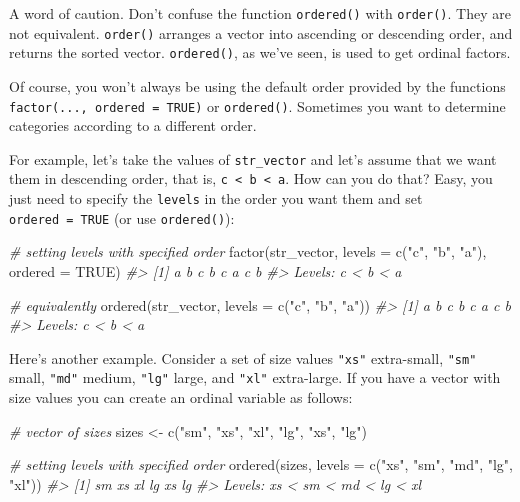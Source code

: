 \documentclass[
]{book}
\newenvironment{Shaded}{\begin{snugshade}}{\end{snugshade}}
\newcommand{\AttributeTok}[1]{\textcolor[rgb]{0.77,0.63,0.00}{#1}}
\newcommand{\CommentTok}[1]{\textcolor[rgb]{0.56,0.35,0.01}{\textit{#1}}}
\newcommand{\ConstantTok}[1]{\textcolor[rgb]{0.00,0.00,0.00}{#1}}
\newcommand{\FunctionTok}[1]{\textcolor[rgb]{0.00,0.00,0.00}{#1}}
\newcommand{\NormalTok}[1]{#1}
\newcommand{\OtherTok}[1]{\textcolor[rgb]{0.56,0.35,0.01}{#1}}
\newcommand{\StringTok}[1]{\textcolor[rgb]{0.31,0.60,0.02}{#1}}
\begin{document}
A word of caution. Don't confuse the function \texttt{ordered()} with \texttt{order()}. They
are not equivalent. \texttt{order()} arranges a vector into ascending or descending
order, and returns the sorted vector. \texttt{ordered()}, as we've seen, is used to
get ordinal factors.

Of course, you won't always be using the default order provided by the
functions \texttt{factor(...,\ ordered\ =\ TRUE)} or \texttt{ordered()}. Sometimes you want to
determine categories according to a different order.

For example, let's take the values of \texttt{str\_vector} and let's assume that we
want them in descending order, that is, \texttt{c\ \textless{}\ b\ \textless{}\ a}. How can you do that? Easy,
you just need to specify the \texttt{levels} in the order you want them and set
\texttt{ordered\ =\ TRUE} (or use \texttt{ordered()}):

\begin{Shaded}
\begin{Highlighting}[]
\CommentTok{\# setting levels with specified order}
\FunctionTok{factor}\NormalTok{(str\_vector, }\AttributeTok{levels =} \FunctionTok{c}\NormalTok{(}\StringTok{"c"}\NormalTok{, }\StringTok{"b"}\NormalTok{, }\StringTok{"a"}\NormalTok{), }\AttributeTok{ordered =} \ConstantTok{TRUE}\NormalTok{)}
\CommentTok{\#\textgreater{} [1] a b c b c a c b}
\CommentTok{\#\textgreater{} Levels: c \textless{} b \textless{} a}

\CommentTok{\# equivalently}
\FunctionTok{ordered}\NormalTok{(str\_vector, }\AttributeTok{levels =} \FunctionTok{c}\NormalTok{(}\StringTok{"c"}\NormalTok{, }\StringTok{"b"}\NormalTok{, }\StringTok{"a"}\NormalTok{))}
\CommentTok{\#\textgreater{} [1] a b c b c a c b}
\CommentTok{\#\textgreater{} Levels: c \textless{} b \textless{} a}
\end{Highlighting}
\end{Shaded}

Here's another example. Consider a set of size values \texttt{"xs"} extra-small, \texttt{"sm"}
small, \texttt{"md"} medium, \texttt{"lg"} large, and \texttt{"xl"} extra-large. If you have a
vector with size values you can create an ordinal variable as follows:

\begin{Shaded}
\begin{Highlighting}[]
\CommentTok{\# vector of sizes}
\NormalTok{sizes }\OtherTok{\textless{}{-}} \FunctionTok{c}\NormalTok{(}\StringTok{"sm"}\NormalTok{, }\StringTok{"xs"}\NormalTok{, }\StringTok{"xl"}\NormalTok{, }\StringTok{"lg"}\NormalTok{, }\StringTok{"xs"}\NormalTok{, }\StringTok{"lg"}\NormalTok{)}

\CommentTok{\# setting levels with specified order}
\FunctionTok{ordered}\NormalTok{(sizes, }\AttributeTok{levels =} \FunctionTok{c}\NormalTok{(}\StringTok{"xs"}\NormalTok{, }\StringTok{"sm"}\NormalTok{, }\StringTok{"md"}\NormalTok{, }\StringTok{"lg"}\NormalTok{, }\StringTok{"xl"}\NormalTok{))}
\CommentTok{\#\textgreater{} [1] sm xs xl lg xs lg}
\CommentTok{\#\textgreater{} Levels: xs \textless{} sm \textless{} md \textless{} lg \textless{} xl}
\end{Highlighting}
\end{Shaded}
\end{document}
